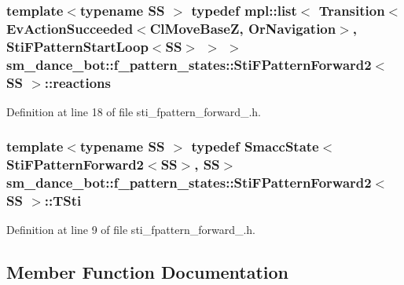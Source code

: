 \subsubsection[{\texorpdfstring{reactions}{reactions}}]{\setlength{\rightskip}{0pt plus 5cm}template$<$typename SS $>$ typedef mpl\+::list$<$ Transition$<$Ev\+Action\+Succeeded$<${\bf Cl\+Move\+BaseZ}, {\bf Or\+Navigation}$>$, {\bf Sti\+F\+Pattern\+Start\+Loop}$<$SS$>$ $>$ $>$ {\bf sm\+\_\+dance\+\_\+bot\+::f\+\_\+pattern\+\_\+states\+::\+Sti\+F\+Pattern\+Forward2}$<$ SS $>$\+::{\bf reactions}}\hypertarget{structsm__dance__bot_1_1f__pattern__states_1_1StiFPatternForward2_a16524d739d8b056a6b53bd9122a3f070}{}\label{structsm__dance__bot_1_1f__pattern__states_1_1StiFPatternForward2_a16524d739d8b056a6b53bd9122a3f070}


Definition at line 18 of file sti\+\_\+fpattern\+\_\+forward\+\_.\+h.

\subsubsection[{\texorpdfstring{T\+Sti}{TSti}}]{\setlength{\rightskip}{0pt plus 5cm}template$<$typename SS $>$ typedef {\bf Smacc\+State}$<${\bf Sti\+F\+Pattern\+Forward2}$<$SS$>$, SS$>$ {\bf sm\+\_\+dance\+\_\+bot\+::f\+\_\+pattern\+\_\+states\+::\+Sti\+F\+Pattern\+Forward2}$<$ SS $>$\+::{\bf T\+Sti}}\hypertarget{structsm__dance__bot_1_1f__pattern__states_1_1StiFPatternForward2_a9579984c93060baa23d437238b0b2f9e}{}\label{structsm__dance__bot_1_1f__pattern__states_1_1StiFPatternForward2_a9579984c93060baa23d437238b0b2f9e}


Definition at line 9 of file sti\+\_\+fpattern\+\_\+forward\+\_.\+h.



\subsection{Member Function Documentation}
